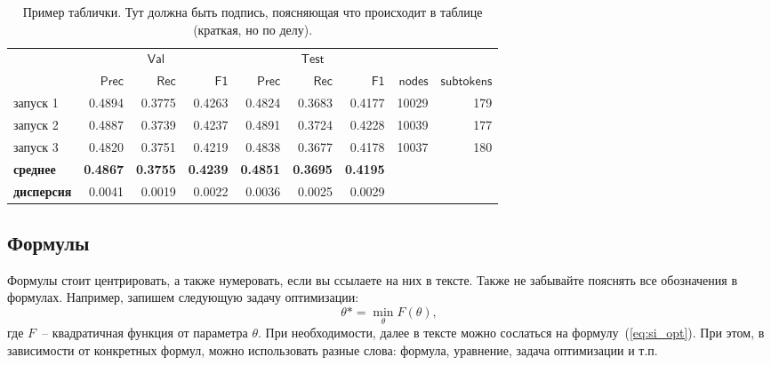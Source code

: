 \documentclass[a4paper,12pt]{extarticle}
\begin{document}
\begin{table}[ht]
	\caption{Пример таблички. Тут должна быть подпись, поясняющая что происходит в таблице (краткая, но по делу).}
	\label{table:long_epochs}
	\footnotesize
	\centering
	\begin{tabular}{lrrrrrrrr}
		\toprule
		& \multicolumn{3}{c}{$\mathsf{Val}$} &
		\multicolumn{3}{c}{$\mathsf{Test}$} \\
		\cmidrule(lr){2-4} \cmidrule(l){5-7} 
		{} &  $\mathsf{Prec}$ &  $\mathsf{Rec}$ &  $\mathsf{F1}$ &  $\mathsf{Prec}$ &  $\mathsf{Rec}$ &  $\mathsf{F1}$  &  $\mathsf{nodes}$ & $\mathsf{subtokens}$\\
		\midrule
		запуск 1    &    0.4894 &   0.3775 &  0.4263 &     0.4824 &    0.3683 &   0.4177 & 10029 & 179\\
		запуск 2    &    0.4887 &   0.3739 &  0.4237 &     0.4891 &    0.3724 &   0.4228 & 10039 & 177\\
		запуск 3    &    0.4820 &   0.3751 &  0.4219 &     0.4838 &    0.3677 &   0.4178 & 10037&	180\\
		\midrule
		\bf{среднее} &    \bf{0.4867} &   \bf{0.3755} &  \bf{0.4239} &    \bf{ 0.4851} &    \bf{0.3695} &   \bf{0.4195} \\
		\bf{дисперсия}  &    0.0041 &   0.0019 &  0.0022 &     0.0036 &    0.0025 &   0.0029 \\
		\bottomrule
	\end{tabular}
\end{table}

\subsection{Формулы}

Формулы стоит центрировать, а также нумеровать, если вы ссылаете на них в тексте. Также не забывайте пояснять все обозначения в формулах. Например, запишем следующую задачу оптимизации:
\begin{equation}
    \label{eq:si_opt}
        \theta* = \min_{\theta} F(\theta),
\end{equation}
где $F$~-- квадратичная функция от параметра $\theta$. При необходимости, далее в тексте можно сослаться на формулу~(\ref{eq:si_opt}). При этом, в зависимости от конкретных формул, можно использовать разные слова: формула, уравнение, задача оптимизации и т.п.


	
\newpage 
\printbibliography[heading=bibintoc] 

	
	
\end{document}
